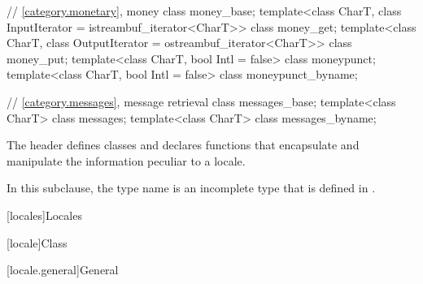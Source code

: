 \begin{codeblock}
{  // \ref{category.monetary}, money
  class money_base;
  template<class CharT, class InputIterator = istreambuf_iterator<CharT>>
    class money_get;
  template<class CharT, class OutputIterator = ostreambuf_iterator<CharT>>
    class money_put;
  template<class CharT, bool Intl = false>
    class moneypunct;
  template<class CharT, bool Intl = false>
    class moneypunct_byname;

  // \ref{category.messages}, message retrieval
  class messages_base;
  template<class CharT> class messages;
  template<class CharT> class messages_byname;
}
\end{codeblock}

\pnum
The header 
defines classes and declares functions
that encapsulate and manipulate the information peculiar to a locale.
\begin{footnote}
In this subclause, the type name 
is an incomplete type that is defined in .
\end{footnote}

[locales]{Locales}

[locale]{Class }

[locale.general]{General}

